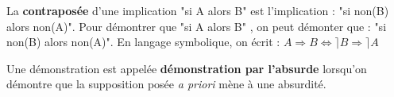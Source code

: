 

\begin{Log}
\begin{description}[leftmargin=*]
\item La \textbf{contraposée} d'une implication "si A alors B" est l'implication : "si non(B) alors non(A)". Pour démontrer que "si A alors B" , on peut démonter que : "si non(B) alors non(A)".  En langage symbolique, on écrit  : $A \Longrightarrow B \Longleftrightarrow \rceil B \Longrightarrow \rceil A$ 
\item Une démonstration est appelée \textbf{démonstration par l'absurde} lorsqu'on démontre que la supposition posée \textit{a priori} mène à une absurdité.
\end{description}
\end{Log}
